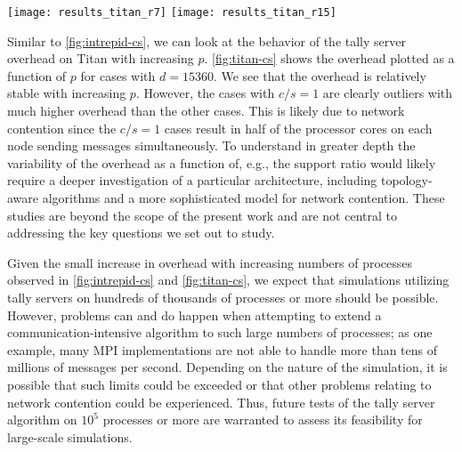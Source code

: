 \documentclass[3p,fleqn]{elsarticle}
\begin{document}
\begin{figure*}[!tbh]
  \begin{floatrow}
     {\texttt{[image: results\_titan\_r7]}}
     {\texttt{[image: results\_titan\_r15]}}
  \end{floatrow}
\end{figure*}

Similar to \autoref{fig:intrepid-cs}, we can look at the behavior of the tally
server overhead on Titan with increasing $p$. \autoref{fig:titan-cs} shows the
overhead plotted as a function of $p$ for cases with $d = 15360$. We see that
the overhead is relatively stable with increasing $p$. However, the cases with
$c/s = 1$ are clearly outliers with much higher overhead than the other
cases. This is likely due to network contention since the $c/s = 1$ cases result
in half of the processor cores on each node sending messages simultaneously. To
understand in greater depth the variability of the overhead as a function of,
e.g., the support ratio would likely require a deeper investigation of a
particular architecture, including topology-aware algorithms and a more
sophisticated model for network contention. These studies are beyond the scope
of the present work and are not central to addressing the key questions we set
out to study.

Given the small increase in overhead with increasing numbers of processes
observed in \autoref{fig:intrepid-cs} and \autoref{fig:titan-cs}, we expect that
simulations utilizing tally servers on hundreds of thousands of processes or
more should be possible. However, problems can and do happen when attempting to
extend a communication-intensive algorithm to such large numbers of processes;
as one example, many MPI implementations are not able to handle more than tens
of millions of messages per second. Depending on the nature of the simulation,
it is possible that such limits could be exceeded or that other problems
relating to network contention could be experienced. Thus, future tests of the
tally server algorithm on $10^5$ processes or more are warranted to assess its
feasibility for large-scale simulations.
\end{document}
